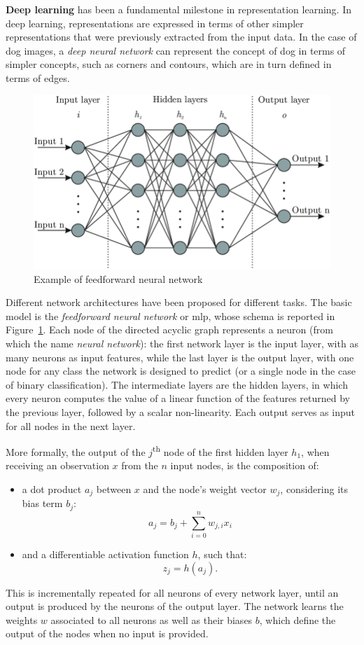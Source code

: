 \documentclass[%
    corpo=12pt,
    twoside,
    stile=classica,   
    tipotesi=magistrale,
    evenboxes,
    english,
	numerazioneromana,
]{toptesi}
\begin{document}
\bigskip
\textbf{Deep learning} has been a fundamental milestone in representation learning. In deep learning, representations are expressed in terms of other simpler representations that were previously extracted from the input data. In the case of dog images, a \textit{deep neural network} can represent the concept of dog in terms of simpler concepts, such as corners and contours, which are in turn defined in terms of edges.

\begin{figure}[ht]
	\centering
	\includegraphics[width=.7\linewidth]{imgs/mlp.png}
	\caption{Example of feedforward neural network}
	\label{fig:mlp}
\end{figure}

\medskip
Different network architectures have been proposed for different tasks. The basic model is the \textit{feedforward neural network} or \gls{mlp}, whose schema is reported in Figure~\ref{fig:mlp}. Each node of the directed acyclic graph represents a neuron (from which the name \textit{neural network}): the first network layer is the input layer, with as many neurons as input features, while the last layer is the output layer, with one node for any class the network is designed to predict (or a single node in the case of binary classification). The intermediate layers are the hidden layers, in which every neuron computes the value of a linear function of the features returned by the previous layer, followed by a scalar non-linearity. Each output serves as input for all nodes in the next layer.

\bigskip
More formally, the output of the $j$\textsuperscript{th} node of the first hidden layer $h_1$, when receiving an observation $x$ from the $n$ input nodes, is the composition of:
\begin{itemize}
	\item a dot product $a_j$ between $x$ and the node's weight vector $w_j$, considering its bias term $b_j$:
	\begin{equation*}
		a_j = b_j + \sum_{i=0}^n w_{j,i}x_i
	\end{equation*}
	\item and a differentiable activation function $h$, such that:
	\begin{equation*}
		z_j = h(a_j)\text{.}
	\end{equation*}
\end{itemize}
This is incrementally repeated for all neurons of every network layer, until an output is produced by the neurons of the output layer. The network learns the weights $w$ associated to all neurons as well as their biases $b$, which define the output of the nodes when no input is provided\cite{amini2015apprentissage}.
\end{document}
